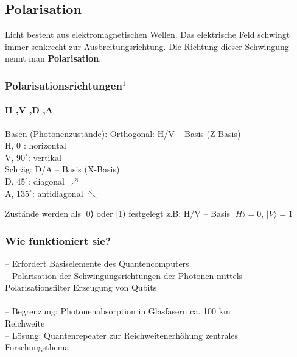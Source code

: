 \subsection{Polarisation}
\begin{frame}
	\begin{theorem}
		Licht besteht aus elektromagnetischen Wellen. Das elektrische Feld schwingt immer senkrecht zur Ausbreitungsrichtung. Die Richtung dieser Schwingung nennt man \textbf{Polarisation}.
	\end{theorem}
\end{frame}
\begin{frame}[allowframebreaks]
	\frametitle{Polarisationsrichtungen$^1$}
	\framesubtitle{H ,V ,D ,A}
	\begin{alertblock}{Basen (Photonenzust{\"a}nde):}
		Orthogonal: H/V – Basis (Z-Basis)\\
			\hspace{0.5em}  H, $0^\circ$: horizontal \textrightarrow\\
			\hspace{0.5em}  V, $90^\circ$: vertikal  \textuparrow\\
		Schr{\"a}g: D/A – Basis (X-Basis)\\
			\hspace{0.5em}  D, $45^\circ$: diagonal $\nearrow$\\
			\hspace{0.5em}  A, $135^\circ$: antidiagonal $\nwarrow$\\
	\end{alertblock}
	\begin{myExamples}{Zustände werden als |0⟩ oder |1⟩ festgelegt}
		z.B: H/V -- Basis \textrightarrow { }$|H\rangle = 0$, $|V\rangle = 1$
	\end{myExamples}
\end{frame}

\begin{frame}
	\frametitle{Wie funktioniert sie?}
	-- Erfordert Basiselemente des Quantencomputers\\
	-- Polarisation der Schwingungsrichtungen der Photonen mittels\\
		\hspace{0.5em} Polarisationsfilter \textrightarrow Erzeugung von Qubits\\
	\vspace{-2.5em}
	\hspace{9em}\\
	\vspace{-2.0em}
	-- Begrenzung: Photonenabsorption in Glasfasern \textrightarrow { }ca. 100 km\\
		\hspace{0.5em} Reichweite\\
	-- L{\"o}sung: Quantenrepeater zur Reichweitenerhöhung \textrightarrow { }zentrales\\
	\hspace{0.5em} Forschungsthema
\end{frame}

